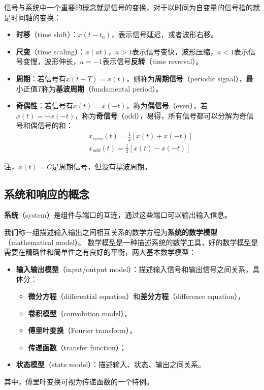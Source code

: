 信号与系统中一个重要的概念就是信号的变换，对于以时间为自变量的信号指的就是时间轴的变换：
\begin{itemize}
    \item {\bf 时移}（time shift）：$x\left( t-t_0 \right) $，表示信号延迟，或者波形右移。
    \item {\bf 尺变}（time scaling）：$x\left( at \right) $，$a>1$表示信号变快，波形压缩，$a<1$表示信号变慢，波形伸长，$a=-1$表示信号{\bf 反转}（time reversal）。
    \item {\bf 周期}：若信号有$x\left( t+T \right) =x\left( t \right) $，则称为{\bf 周期信号}（periodic signal），最小正值$T$称为{\bf 基波周期}（fundamental period）。
    \item {\bf 奇偶性}：若信号有$x\left( t \right) =x\left( -t \right) $，称为{\bf 偶信号}（even），若$x\left( t \right) =-x\left( -t \right) $，称为{\bf 奇信号}（odd），易得，所有信号都可以分解为奇信号和偶信号的和：
    \begin{align*}
    &x_{even}\left( t \right) =\frac{1}{2}\left[ x\left( t \right) +x\left( -t \right) \right] \\
    &x_{odd}\left( t \right) =\frac{1}{2}\left[ x\left( t \right) -x\left( -t \right) \right]
    \end{align*}
\end{itemize}

\begin{tcolorbox}
注，$x\left( t \right) =C$是周期信号，但没有基波周期。
\end{tcolorbox}

\subsection{系统和响应的概念}

\begin{definition}[系统]
{\bf 系统}（system）是组件与端口的互连，通过这些端口可以输出输入信息。
\end{definition}

我们称一组描述输入输出之间相互关系的数学方程为{\bf 系统的数学模型}（mathematical model）。
数学模型是一种描述系统的数学工具，好的数学模型是需要在精确性和简单性之有良好的平衡，两大基本数学模型：
\begin{itemize}
    \item {\bf 输入输出模型}（input/output model）：描述输入信号和输出信号之间关系，具体分：
    \begin{itemize}
        \item {\bf 微分方程}（differential equation）和{\bf 差分方程}（difference equation），
        \item {\bf 卷积模型}（convolution model），
        \item {\bf 傅里叶变换}（Fourier transform），
        \item {\bf 传递函数}（transfer function）；
    \end{itemize}
    \item {\bf 状态模型}（state model）：描述输入、状态、输出之间关系。
\end{itemize}
其中，傅里叶变换可视为传递函数的一个特例。

